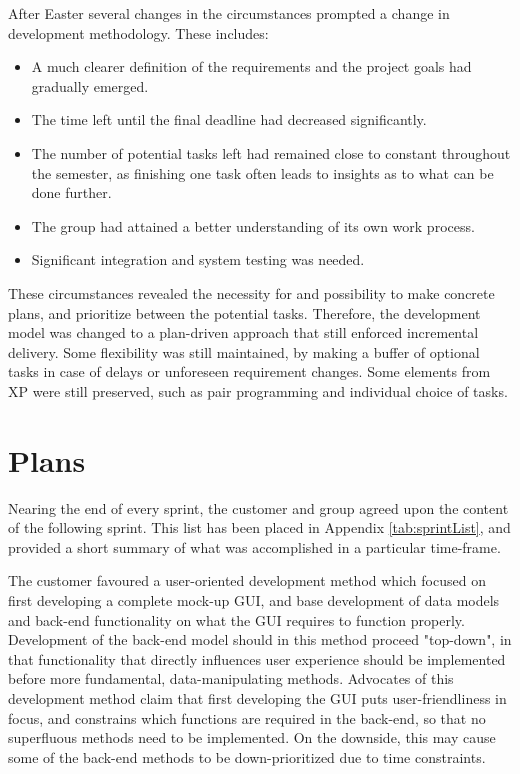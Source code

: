 After Easter several changes in the circumstances prompted a change in development methodology. These includes:
\begin{itemize}
\item A much clearer definition of the requirements and the project goals had gradually emerged.
\item The time left until the final deadline had decreased significantly.
\item The number of potential tasks left had remained close to constant throughout the semester, as finishing one task often leads to insights as to what can be done further.
\item The group had attained a better understanding of its own work process. 
\item Significant integration and system testing was needed.
\end{itemize}
These circumstances revealed the necessity for and possibility to make concrete plans, and prioritize between the potential tasks. Therefore,  the development model was changed to a plan-driven approach that still enforced incremental delivery. Some flexibility was still maintained, by making a buffer of optional tasks in case of delays or unforeseen requirement changes. Some elements from XP were still preserved, such as pair programming and individual choice of tasks.


\section{Plans}	

Nearing the end of every sprint, the customer and group agreed upon the content of the following sprint. This list has been placed in Appendix \ref{tab:sprintList}, and provided a short summary of what was accomplished in a particular time-frame. 

The customer favoured a user-oriented development method which focused on first developing a complete mock-up GUI, and base development of data models and back-end functionality on what the GUI requires to function properly. Development of the back-end model should in this method proceed "top-down", in that functionality that directly influences user experience should be implemented before more fundamental, data-manipulating methods. Advocates of this development method claim that first developing the GUI puts user-friendliness in focus, and constrains which functions are required in the back-end, so that no superfluous methods need to be implemented. On the downside, this may cause some of the back-end methods to be down-prioritized due to time constraints.

